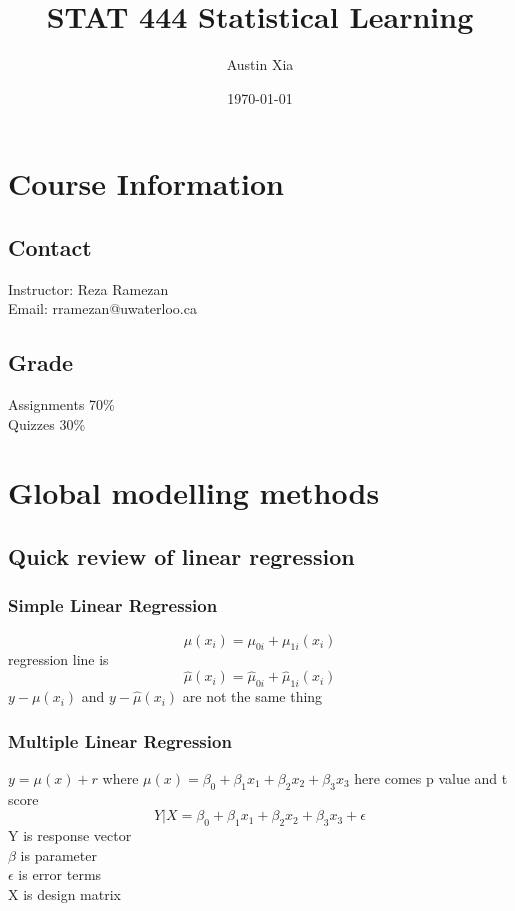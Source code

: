 \documentclass[10pt]{article}
\theoremstyle{break}
\begin{document}
\let\ref\Cref

\title{\bf{STAT 444 Statistical Learning}}
\date{\today}
\author{Austin Xia}

\maketitle
\newpage
\tableofcontents
\listoffigures
\listoftables
\newpage
\section{Course Information}
    \subsection{Contact}
        \begin{center}
            Instructor: Reza Ramezan\\
            Email: rramezan@uwaterloo.ca
        \end{center}
    \subsection{Grade}
        \begin{center}
            Assignments 70\%\\
            Quizzes 30\%\\
        \end{center}
\section{Global modelling methods}
    \subsection{Quick review of linear regression}
        \subsubsection{Simple Linear Regression}
            $$\mu(x_i)=\mu_{0i}+\mu_{1i}(x_i)$$
            regression line is\\
            $$\hat{\mu}(x_i)=\hat{\mu}_{0i}+\hat{\mu}_{1i}(x_i)$$
            $y-\mu(x_i)$ and $y-\hat{\mu}(x_i)$ are not the same thing
        \subsubsection{Multiple Linear Regression}
            $y=\mu(x)+r$ where $\mu(x)=\beta_0+\beta_1x_1+\beta_2x_2+\beta_3x_3$
            here comes p value and t score\\
            $$Y|X=\beta_0+\beta_1x_1+\beta_2x_2+\beta_3x_3+\epsilon $$
            Y is response vector\\$\beta$ is parameter\\$\epsilon$ is error terms\\X is design matrix
\end{document}
